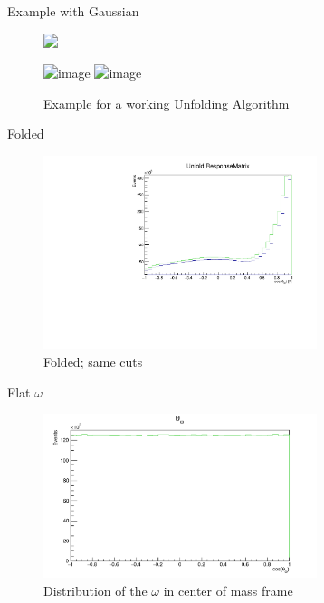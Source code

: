 \documentclass[
		10pt
		]{beamer}
\begin{document}
\begin{frame}{Example with Gaussian}
	
\begin{figure}
	\includegraphics<1>[width=8cm]{Plots/truth}

	\includegraphics<2>[width=8cm]{Plots/meas_truth}
	\includegraphics<3>[width=8cm]{Plots/folded}
	\captionsetup{labelformat=empty}
	\caption{Example for a working Unfolding Algorithm}
\end{figure}
	
	
\end{frame}




\begin{frame}{Folded}
	\begin{figure}
		\includegraphics[width=8cm]{Plots/WholeUnfold35.pdf}
		\captionsetup{labelformat=empty}
		\caption{Folded; same cuts}
	\end{figure}
\end{frame}

\begin{frame}{Flat $\omega$}
	\begin{figure}
		\includegraphics[width=8cm]{Plots/OmegaFlat.pdf}
		\captionsetup{labelformat=empty}
		\caption{Distribution of the $\omega$ in center of mass frame}
	\end{figure}
\end{frame}
\end{document}
